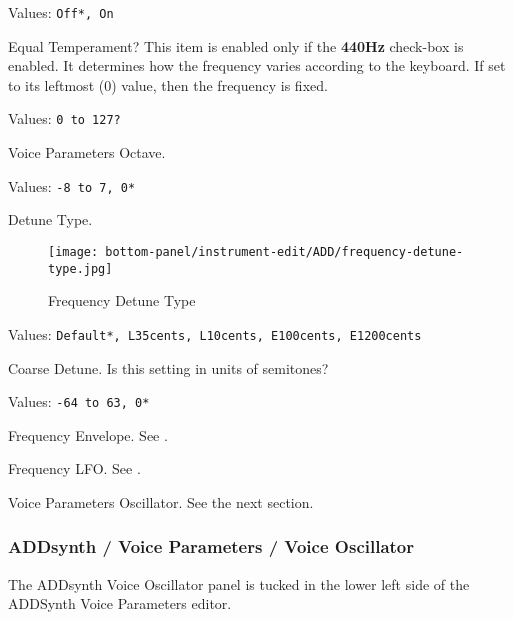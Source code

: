    Values: \texttt{Off*, On}

   Equal Temperament?
   This item is enabled only if the \textbf{440Hz} check-box is enabled.
   It determines how the frequency varies according to the 
   keyboard.  If set to its leftmost (0) value, then the frequency is fixed.

   Values: \texttt{0 to 127?}

   Voice Parameters Octave.

   Values: \texttt{-8 to 7, 0*}

%

   Detune Type.

\begin{figure}[H]
   \centering 
   \texttt{[image: bottom-panel/instrument-edit/ADD/frequency-detune-type.jpg]}
   \caption{Frequency Detune Type}
   \label{fig:frequency_detune_tYpe}
\end{figure}

   Values: \texttt{Default*, L35cents, L10cents, E100cents, E1200cents}

   Coarse Detune.
   Is this setting in units of semitones?

   Values: \texttt{-64 to 63, 0*}

   Frequency Envelope.
   See .

   Frequency LFO.
   See .

   Voice Parameters Oscillator.
   See the next section.

\subsubsection{ADDsynth / Voice Parameters / Voice Oscillator}
\label{subsubsec:addsynth_voice_parameters_oscillator}

   The ADDsynth Voice Oscillator panel is tucked in the lower left side of the
   ADDSynth Voice Parameters editor.

